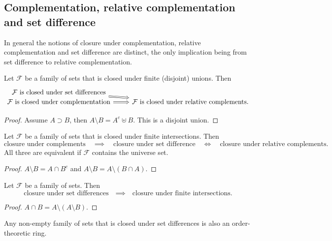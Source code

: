 \subsection{Complementation, relative complementation and set difference}
In general the notions of closure under complementation, relative complementation and set difference are distinct, the only implication being from set difference to relative complementation.

\begin{lemma} \label{complementTypesUnionClosure}
Let $\mathcal{F}$ be a family of sets that is closed under finite (disjoint) unions. Then
\[ \begin{tikzcd}[row sep=0]
\text{$\mathcal{F}$ is closed under set differences} \arrow[dr, Rightarrow] & \\
\text{$\mathcal{F}$ is closed under complementation} \arrow[r,Rightarrow] & \text{$\mathcal{F}$ is closed under relative complements.}
\end{tikzcd} \]
\end{lemma}
\begin{proof}
Assume $A\supset B$, then $A\setminus B = A^c \uplus B$. This is a disjoint union.
\end{proof}

\begin{lemma}
Let $\mathcal{F}$ be a family of sets that is closed under finite intersections. Then
\[ \text{closure under complements} \quad\implies\quad \text{closure under set difference} \quad\iff\quad \text{closure under relative complements.} \]
All three are equivalent if $\mathcal{F}$ contains the universe set.
\end{lemma}
\begin{proof}
$A\setminus B = A\cap B^c$ and $A\setminus B = A\setminus (B\cap A)$.
\end{proof}

\begin{lemma} \label{closureSetDifference}
Let $\mathcal{F}$ be a family of sets. Then
\[ \text{closure under set differences} \quad\implies\quad \text{closure under finite intersections.} \]
\end{lemma}
\begin{proof}
$A\cap B = A\setminus (A\setminus B)$.
\end{proof}

Any non-empty family of sets that is closed under set differences is also an order-theoretic ring.

